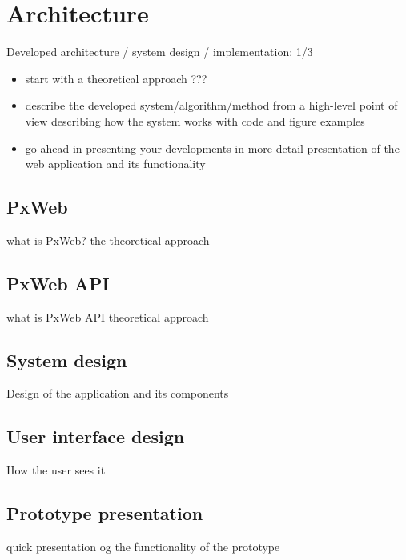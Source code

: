 \chapter{Architecture}
Developed architecture / system design / implementation: 1/3

\begin{itemize}
	\item start with a theoretical approach
	      ???
	\item describe the developed system/algorithm/method from a high-level point of view
	      describing how the system works with code and figure examples
	\item go ahead in presenting your developments in more detail
	      presentation of the web application and its functionality
\end{itemize}


\section{PxWeb}
what is PxWeb? the theoretical approach
\section{PxWeb API}
what is PxWeb API theoretical approach 
\section{System design}
Design of the application and its components
\section{User interface design}
How the user sees it
\section{Prototype presentation}
quick presentation og the functionality of the prototype